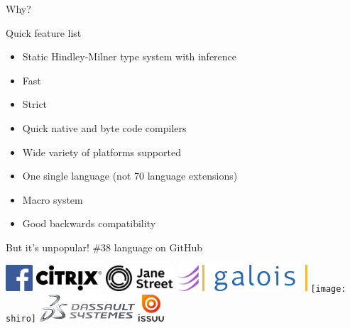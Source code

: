 \documentclass{beamer}
\begin{document}
\begin{frame}{}
  \center
  \fontsize{70}{70} \exclaim Why?
\end{frame}

\begin{frame}{Quick feature list}
  \begin{itemize}
    \item Static Hindley-Milner type system with inference
    \item Fast
    \item Strict
    \item Quick native and byte code compilers
    \item Wide variety of platforms supported
    \item One single language (not 70 language extensions)
    \item Macro system
    \item Good backwards compatibility
  \end{itemize}
\end{frame}

\begin{frame}{But it's unpopular!}
  \#38 language on GitHub

  \includegraphics[height=1cm]{facebook}
  \includegraphics[height=1cm]{citrix}
  \includegraphics[height=1cm]{janestreet}
  \includegraphics[height=1cm]{esper}
  \includegraphics[height=1cm]{galois}
  \texttt{[image: shiro]}
  \includegraphics[height=1cm]{ds}
  \includegraphics[height=1cm]{issuu}
\end{frame}
\end{document}
